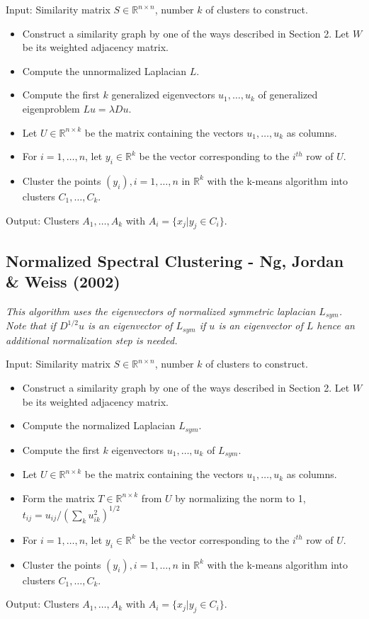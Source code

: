 \documentclass[10pt,a4paper, nocenter]{report}
\begin{document}
	Input: Similarity matrix $S \in \mathbb{R}^{n\times n}$, number $k$ of clusters to construct.
	\begin{itemize}
		\item Construct a similarity graph by one of the ways described in Section 2. Let $W$ be its weighted adjacency matrix.
		\item Compute the unnormalized Laplacian $L$.
		\item Compute the first $k$ generalized eigenvectors $u_{1},\dots, u_{k} $ of generalized eigenproblem $Lu = \lambda Du$.
		\item Let $U \in \mathbb{R}^{n\times k}$ be the matrix containing the vectors $u_{1},\dots, u_{k}$ as columns.
		\item For $i = 1,\dots, n$, let $y_{i} \in \mathbb{R}^k$ be the vector corresponding to the $i^{th}$ row of $U$.
		\item Cluster the points $(y_{i}), i=1,\dots,n$ in $\mathbb{R}^k$ with the k-means algorithm into clusters $C_{1},\dots, C_{k}$.
	\end{itemize}
	Output: Clusters $A_{1},\dots, A_{k}$ with $A_{i} = \{x_{j}| y_{j} \in C_{i}\}$.

	\subsection{Normalized Spectral Clustering - Ng, Jordan \& Weiss (2002)\cite{ng-jordan-01}}
	\textit{This algorithm uses the eigenvectors of normalized symmetric laplacian $L_{sym}$. Note that if $D^{1/2}u$ is an eigenvector of $L_{sym}$ if $u$ is an eigenvector of $L$ hence an additional normalization step is needed.}

	Input: Similarity matrix $S \in \mathbb{R}^{n\times n}$, number $k$ of clusters to construct.
	\begin{itemize}
		\item Construct a similarity graph by one of the ways described in Section 2. Let $W$ be its weighted adjacency matrix.
		\item Compute the normalized Laplacian $L_{sym}$.
		\item Compute the first $k$ eigenvectors $u_{1},\dots, u_{k} $ of $L_{sym}$.
		\item Let $U \in \mathbb{R}^{n\times k}$ be the matrix containing the vectors $u_{1},\dots, u_{k}$ as columns.
		\item Form the matrix $T \in \mathbb{R}^{n\times k}$ from $U$ by normalizing the norm to 1, $t_{ij} = u_{ij}/(\sum_{k}u_{ik}^2)^{1/2}$
		\item For $i = 1,\dots, n$, let $y_{i} \in \mathbb{R}^k$ be the vector corresponding to the $i^{th}$ row of $U$.
		\item Cluster the points $(y_{i}), i=1,\dots,n$ in $\mathbb{R}^k$ with the k-means algorithm into clusters $C_{1},\dots, C_{k}$.
	\end{itemize} Output: Clusters $A_{1},\dots, A_{k}$ with $A_{i} = \{x_{j}| y_{j} \in C_{i}\}$.
\end{document}
